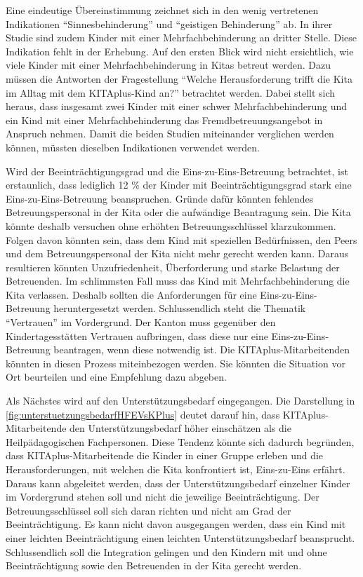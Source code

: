 \documentclass[
  ngerman,
  11pt,
  paper=a4,
  twoside,
  titlepage=true,
  openright,
  abstract=on,
  toc=listofnumbered,
  numbers=noenddot,
  chapterprefix=true,
  headings=optiontohead,
  svgnames,
  dvipsnames]{scrreprt}
\begin{document}
Eine eindeutige Übereinstimmung zeichnet sich in den wenig vertretenen
Indikationen “Sinnesbehinderung” und “geistigen Behinderung” ab. In
ihrer Studie sind zudem Kinder mit einer Mehrfachbehinderung an dritter
Stelle. Diese Indikation fehlt in der Erhebung. Auf den ersten Blick
wird nicht ersichtlich, wie viele Kinder mit einer Mehrfachbehinderung
in Kitas betreut werden. Dazu müssen die Antworten der Fragestellung
“Welche Herausforderung trifft die Kita im Alltag mit dem KITAplus-Kind
an?” betrachtet werden. Dabei stellt sich heraus, dass insgesamt zwei
Kinder mit einer schwer Mehrfachbehinderung und ein Kind mit einer
Mehrfachbehinderung das Fremdbetreuungsangebot in Anspruch nehmen. Damit
die beiden Studien miteinander verglichen werden können, müssten
dieselben Indikationen verwendet werden.

Wird der Beeinträchtigungsgrad und die Eins-zu-Eins-Betreuung
betrachtet, ist erstaunlich, dass lediglich 12 \% der Kinder mit
Beeinträchtigungsgrad stark eine Eins-zu-Eins-Betreuung beanspruchen.
Gründe dafür könnten fehlendes Betreuungspersonal in der Kita oder die
aufwändige Beantragung sein. Die Kita könnte deshalb versuchen ohne
erhöhten Betreuungsschlüssel klarzukommen. Folgen davon könnten sein,
dass dem Kind mit speziellen Bedürfnissen, den Peers und dem
Betreuungspersonal der Kita nicht mehr gerecht werden kann. Daraus
resultieren könnten Unzufriedenheit, Überforderung und starke Belastung
der Betreuenden. Im schlimmsten Fall muss das Kind mit
Mehrfachbehinderung die Kita verlassen. Deshalb sollten die
Anforderungen für eine Eins-zu-Eins-Betreuung heruntergesetzt werden.
Schlussendlich steht die Thematik “Vertrauen” im Vordergrund. Der Kanton
muss gegenüber den Kindertagesstätten Vertrauen aufbringen, dass diese
nur eine Eins-zu-Eins-Betreuung beantragen, wenn diese notwendig ist.
Die KITAplus-Mitarbeitenden könnten in diesen Prozess miteinbezogen
werden. Sie könnten die Situation vor Ort beurteilen und eine Empfehlung
dazu abgeben.

Als Nächstes wird auf den Unterstützungsbedarf eingegangen. Die
Darstellung in \cref{fig:unterstuetzungsbedarfHFEVsKPlus} deutet darauf
hin, dass KITAplus-Mitarbeitende den Unterstützungsbedarf höher
einschätzen als die Heilpädagogischen Fachpersonen. Diese Tendenz könnte
sich dadurch begründen, dass KITAplus-Mitarbeitende die Kinder in einer
Gruppe erleben und die Herausforderungen, mit welchen die Kita
konfrontiert ist, Eins-zu-Eins erfährt. Daraus kann abgeleitet werden,
dass der Unterstützungsbedarf einzelner Kinder im Vordergrund stehen
soll und nicht die jeweilige Beeinträchtigung. Der Betreuungsschlüssel
soll sich daran richten und nicht am Grad der Beeinträchtigung. Es kann
nicht davon ausgegangen werden, dass ein Kind mit einer leichten
Beeinträchtigung einen leichten Unterstützungsbedarf beansprucht.
Schlussendlich soll die Integration gelingen und den Kindern mit und
ohne Beeinträchtigung sowie den Betreuenden in der Kita gerecht werden.
\end{document}
